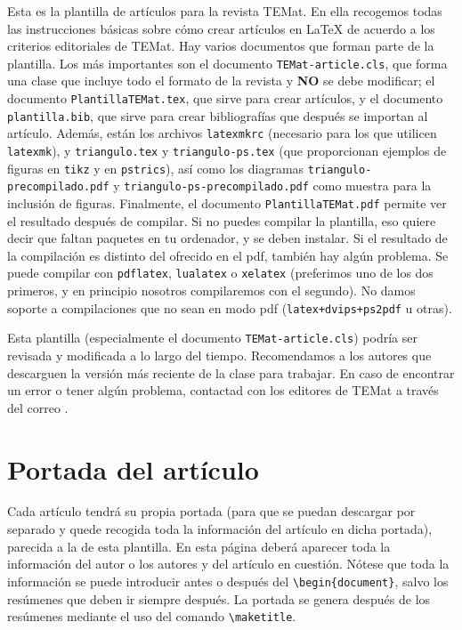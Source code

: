 \documentclass[bibtex]{TEMat-article}
\begin{document}
Esta es la plantilla de artículos para la revista TEMat.
En ella recogemos todas las instrucciones básicas sobre cómo crear artículos en \LaTeX{} de acuerdo a los criterios editoriales de TEMat.
Hay varios documentos que forman parte de la plantilla.
Los más importantes son el documento \verb+TEMat-article.cls+, que forma una clase que incluye todo el formato de la revista y \textbf{NO} se debe modificar; el documento \verb+PlantillaTEMat.tex+, que sirve para crear artículos, y el documento \verb+plantilla.bib+, que sirve para crear bibliografías que después se importan al artículo.
Además, están los archivos \verb+latexmkrc+ (necesario para los que utilicen \verb+latexmk+), y \verb+triangulo.tex+ y \verb+triangulo-ps.tex+ (que proporcionan ejemplos de figuras en \verb+tikz+ y en \verb+pstrics+), así como los diagramas \verb+triangulo-precompilado.pdf+ y \verb+triangulo-ps-precompilado.pdf+ como muestra para la inclusión de figuras.
Finalmente, el documento \verb+PlantillaTEMat.pdf+ permite ver el resultado después de compilar.
Si no puedes compilar la plantilla, eso quiere decir que faltan paquetes en tu ordenador, y se deben instalar.
Si el resultado de la compilación es distinto del ofrecido en el pdf, también hay algún problema.
Se puede compilar con \verb+pdflatex+, \verb+lualatex+ o \verb+xelatex+ (preferimos uno de los dos primeros, y en principio nosotros compilaremos con el segundo).
No damos soporte a compilaciones que no sean en modo pdf (\verb|latex+dvips+ps2pdf| u otras).

Esta plantilla (especialmente el documento \verb+TEMat-article.cls+) podría ser revisada y modificada a lo largo del tiempo.
Recomendamos a los autores que descarguen la versión más reciente de la clase para trabajar.
En caso de encontrar un error o tener algún problema, contactad con los editores de TEMat a través del correo .

\section{Portada del artículo}

Cada artículo tendrá su propia portada (para que se puedan descargar por separado y quede recogida toda la información del artículo en dicha portada), parecida a la de esta plantilla.
En esta página deberá aparecer toda la información del autor o los autores y del artículo en cuestión.
Nótese que toda la información se puede introducir antes o después del \verb+\begin{document}+, salvo los resúmenes que deben ir siempre después.
La portada se genera después de los resúmenes mediante el uso del comando \verb+\maketitle+.
\end{document}
